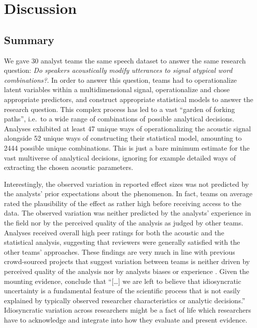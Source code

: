 \documentclass[Review,times,sageh]{sagej}
\begin{document}
\hypertarget{discussion}{%
\section{Discussion}\label{discussion}}

\hypertarget{summary}{%
\subsection{Summary}\label{summary}}

We gave 30 analyst teams the same speech dataset to answer the same research question: \emph{Do speakers acoustically modify utterances to signal atypical word combinations?}.
In order to answer this question, teams had to operationalize latent variables within a multidimensional signal, operationalize and chose appropriate predictors, and construct appropriate statistical models to answer the research question.
This complex process has led to a vast ``garden of forking paths'', i.e.~to a wide range of combinations of possible analytical decisions.
Analyses exhibited at least 47 unique ways of operationalizing the acoustic signal alongside 52 unique ways of constructing their statistical model, amounting to 2444 possible unique combinations.
This is just a bare minimum estimate for the vast multiverse of analytical decisions, ignoring for example detailed ways of extracting the chosen acoustic parameters.

Interestingly, the observed variation in reported effect sizes was not predicted by the analysts' prior expectations about the phenomenon.
In fact, teams on average rated the plausibility of the effect as rather high before receiving access to the data.
The observed variation was neither predicted by the analysts' experience in the field nor by the perceived quality of the analysis as judged by other teams.
Analyses received overall high peer ratings for both the acoustic and the statistical analysis, suggesting that reviewers were generally satisfied with the other teams' approaches.
These findings are very much in line with previous crowd-sourced projects that suggest variation between teams is neither driven by perceived quality of the analysis nor by analysts biases or experience \citep[e.g.,][\citet{breznau2021observing}]{silberzahn2018many}.
Given the mounting evidence, \citet{breznau2021observing} conclude that ``{[}\ldots{]} we are left to believe that idiosyncratic uncertainty is a fundamental feature of the scientific process that is not easily explained by typically observed researcher characteristics or analytic decisions.''
Idiosyncratic variation across researchers might be a fact of life which researchers have to acknowledge and integrate into how they evaluate and present evidence.
\end{document}
